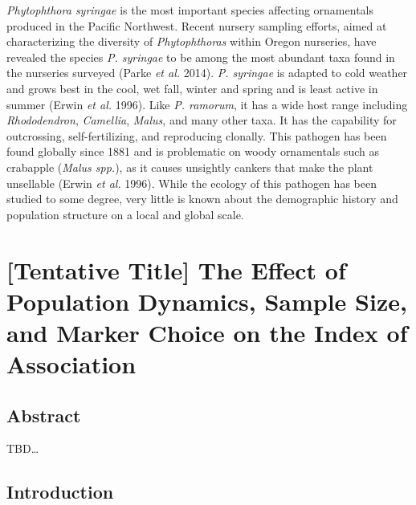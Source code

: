 \documentclass[double,12pt]{beavtex}
\begin{document}
  \emph{Phytophthora syringae} is the most important species affecting
  ornamentals produced in the Pacific Northwest. Recent nursery sampling
  efforts, aimed at characterizing the diversity of \emph{Phytophthoras}
  within Oregon nurseries, have revealed the species \emph{P. syringae} to
  be among the most abundant taxa found in the nurseries surveyed (Parke
  \emph{et al.} 2014). \emph{P. syringae} is adapted to cold weather and
  grows best in the cool, wet fall, winter and spring and is least active
  in summer (Erwin \emph{et al.} 1996). Like \emph{P. ramorum}, it has a
  wide host range including \emph{Rhododendron}, \emph{Camellia},
  \emph{Malus}, and many other taxa. It has the capability for
  outcrossing, self-fertilizing, and reproducing clonally. This pathogen
  has been found globally since 1881 and is problematic on woody
  ornamentals such as crabapple (\emph{Malus spp.}), as it causes
  unsightly cankers that make the plant unsellable (Erwin \emph{et al.}
  1996). While the ecology of this pathogen has been studied to some
  degree, very little is known about the demographic history and
  population structure on a local and global scale.
  
  \chapter{{[}Tentative Title{]} The Effect of Population Dynamics, Sample
  Size, and Marker Choice on the Index of
  Association}\label{tentative-title-the-effect-of-population-dynamics-sample-size-and-marker-choice-on-the-index-of-association}
  
  \section{Abstract}\label{abstract-4}
  
  TBD\ldots{}
  
  \section{Introduction}\label{introduction-3}
  
\end{document}
